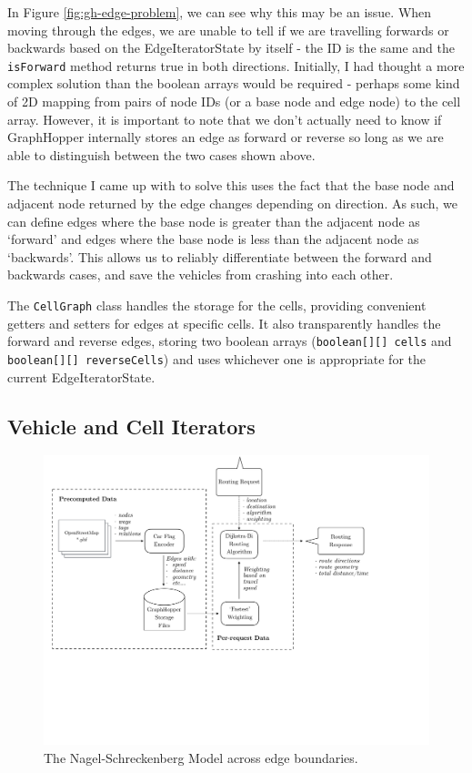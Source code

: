 \documentclass[ %
                    author={Alexander Hill},
                supervisor={Dr. Benjamin Sach},
                    degree={MEng},
                     title={MARMOSET},
                  subtitle={Multi-Agent Route Management using Online Simulation for Efficient Transportation},
                      type={research},
                      year={2016} ]{dissertation}
\begin{document}
In Figure \ref{fig:gh-edge-problem}, we can see why this may be an issue. When
moving through the edges, we are unable to tell if we are travelling forwards or
backwards based on the EdgeIteratorState by itself - the ID is the same and the
\texttt{isForward} method returns true in both directions. Initially, I had
thought a more complex solution than the boolean arrays would be required -
perhaps some kind of 2D mapping from pairs of node IDs (or a base node and edge
node) to the cell array. However, it is important to note that we don't actually
need to know if GraphHopper internally stores an edge as forward or reverse so
long as we are able to distinguish between the two cases shown above.

The technique I came up with to solve this uses the fact that the base node and
adjacent node returned by the edge changes depending on direction. As such, we
can define edges where the base node is greater than the adjacent node as
`forward' and edges where the base node is less than the adjacent node as
`backwards'. This allows us to reliably differentiate between the forward and
backwards cases, and save the vehicles from crashing into each other.

The \texttt{CellGraph} class handles the storage for the cells, providing
convenient getters and setters for edges at specific cells. It also
transparently handles the forward and reverse edges, storing two boolean arrays
(\texttt{boolean[][] cells} and \texttt{boolean[][] reverseCells}) and uses
whichever one is appropriate for the current EdgeIteratorState.

\subsection{Vehicle and Cell Iterators}

\begin{figure}[h]
    \centering
    \includegraphics[scale=0.5,page=5,clip,trim=0 15cm 15cm 0]{architecture}
    \caption{The Nagel-Schreckenberg Model across edge boundaries.}\label{fig:nagel-multi}
\end{figure}
\end{document}
